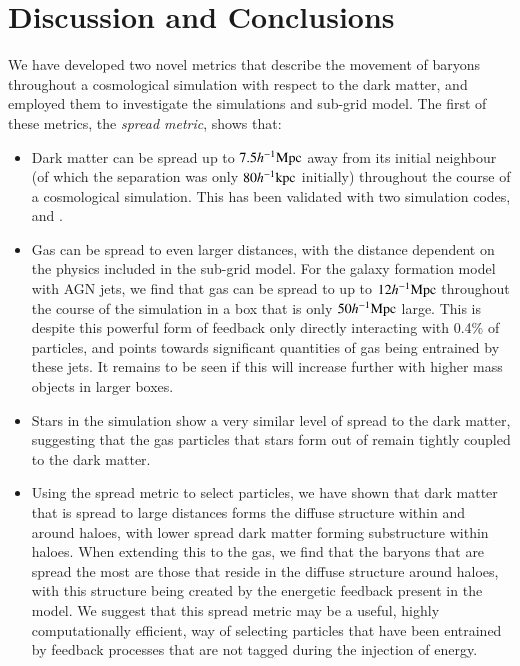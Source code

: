\section{Discussion and Conclusions}
\label{sec:conclusions}

We have developed two novel metrics that describe the movement of baryons
throughout a cosmological simulation with respect to the dark matter, and
employed them to investigate the \simba{} simulations and sub-grid model.
The first of these metrics, the {\it spread metric}, shows that:
\begin{itemize}
    \item Dark matter can be spread up to $7.5h^{-1}{\rm Mpc}{}$ away from its
          initial neighbour (of which the separation was only $80h^{-1}{\rm kpc}{}$
          initially) throughout the course of a cosmological simulation. This
          has been validated with two simulation codes, \gizmo{} and \swift{}.
    \item Gas can be spread to even larger distances, with the distance
          dependent on the physics included in the sub-grid model. For the \simba{}
          galaxy formation model with AGN jets, we find that gas can be spread to
          up to $12h^{-1}{\rm Mpc}{}$ throughout the course of the simulation in a box that
          is only $50h^{-1}{\rm Mpc}{}$ large. This is despite this powerful form of feedback
          only directly interacting with 0.4\% of particles, and points towards
          significant quantities of gas being entrained by these jets. It remains
          to be seen if this will increase further with higher mass objects in
          larger boxes.
    \item Stars in the simulation show a very similar level of spread to the
          dark matter, suggesting that the gas particles that stars form out
          of remain tightly coupled to the dark matter.
    \item Using the spread metric to select particles, we have shown that
          dark matter that is spread to large distances forms the diffuse
          structure within and around haloes, with lower spread dark matter
          forming substructure within haloes. When extending this to the gas,
          we find that the baryons that are spread the most are those that
          reside in the diffuse structure around haloes, with this structure
          being created by the energetic feedback present in the \simba{}
          model. We suggest that this spread metric may be a useful, highly
          computationally efficient, way of selecting particles that have been
          entrained by feedback processes that are not tagged during the
          injection of energy.
\end{itemize}
